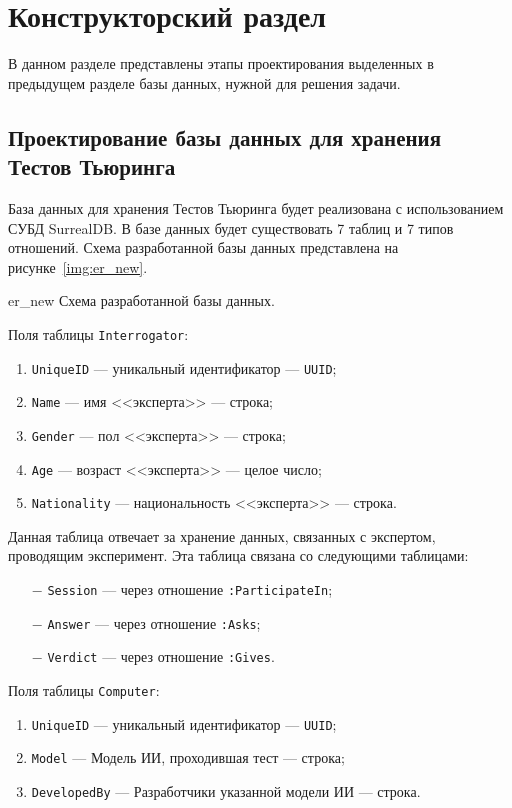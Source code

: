\section{Конструкторский раздел}
В данном разделе представлены этапы проектирования выделенных в предыдущем разделе базы данных, нужной для решения задачи.

\subsection{Проектирование базы данных для хранения Тестов Тьюринга}  
База данных для хранения Тестов Тьюринга будет реализована с использованием СУБД SurrealDB.
В базе данных будет существовать 7 таблиц и 7 типов отношений. 
Схема разработанной базы данных представлена на рисунке~\ref{img:er_new}.

\img{125mm}
{er_new}
{Схема разработанной базы данных.}

Поля таблицы \texttt{Interrogator}: 
\begin{enumerate}
    \item \texttt{UniqueID} --- уникальный идентификатор --- \texttt{UUID};
    \item \texttt{Name} --- имя <<эксперта>> --- строка;
    \item \texttt{Gender} --- пол <<эксперта>> --- строка;
    \item \texttt{Age} --- возраст <<эксперта>> --- целое число;
    \item \texttt{Nationality} --- национальность <<эксперта>> --- строка.
\end{enumerate}

Данная таблица отвечает за хранение данных, связанных с экспертом, проводящим эксперимент.
Эта таблица связана со следующими таблицами:
\begin{itemize}
    \item[$-$] \texttt{Session} --- через отношение \texttt{:ParticipateIn};
    \item[$-$] \texttt{Answer} --- через отношение \texttt{:Asks};
    \item[$-$] \texttt{Verdict} --- через отношение \texttt{:Gives}.
\end{itemize}

Поля таблицы \texttt{Computer}:
\begin{enumerate}
    \item \texttt{UniqueID} --- уникальный идентификатор --- \texttt{UUID};
    \item \texttt{Model} --- Модель ИИ, проходившая тест --- строка;
    \item \texttt{DevelopedBy} --- Разработчики указанной модели ИИ --- строка.
\end{enumerate}

